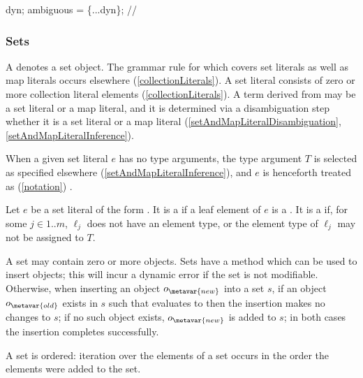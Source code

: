 \documentclass[makeidx]{article}
\begin{document}
{

\begin{dartCode}
\DYNAMIC{} dyn;
\VAR{} ambiguous = \{...dyn\}; // 
\end{dartCode}


\subsubsection{Sets}

\LMHash{}%
A  denotes a set object.
The grammar rule for  which covers
set literals as well as map literals occurs elsewhere
(\ref{collectionLiterals}).
A set literal consists of zero or more collection literal elements
(\ref{collectionLiterals}).
A term derived from 
may be a set literal or a map literal,
and it is determined via a disambiguation step
whether it is a set literal or a map literal
(\ref{setAndMapLiteralDisambiguation}, \ref{setAndMapLiteralInference}).

\LMHash{}%
When a given set literal $e$ has no type arguments,
the type argument $T$ is selected as specified elsewhere
(\ref{setAndMapLiteralInference}),
and $e$ is henceforth treated as
(\ref{notation})
.


\LMHash{}%
Let $e$ be a set literal of the form
.
It is a  if a leaf element of $e$ is a
.
It is a  if, for some $j \in 1 .. m$,
$\ell_j$ does not have an element type,
or the element type of $\ell_j$ may not be assigned to $T$.

\LMHash{}%
A set may contain zero or more objects.
Sets have a method which can be used to insert objects;
this will incur a dynamic error if the set is not modifiable.
Otherwise, when inserting an object $o_{\metavar{new}}$ into a set $s$,
if an object $o_{\metavar{old}}$ exists in $s$ such that
 evaluates to \TRUE{}
then the insertion makes no changes to $s$;
if no such object exists,
$o_{\metavar{new}}$ is added to $s$;
in both cases the insertion completes successfully.

\LMHash{}%
A set is ordered: iteration over the elements of a set
occurs in the order the elements were added to the set.

}
\end{document}

